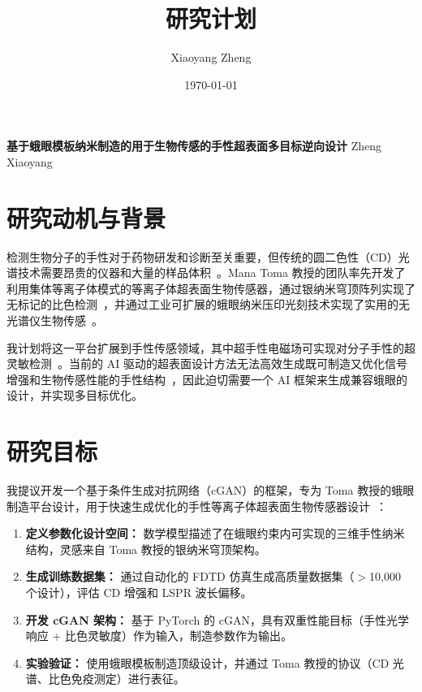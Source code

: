 \documentclass[11pt,a4paper]{article}
\title{研究计划}
\author{Xiaoyang Zheng}
\date{\today}
\begin{document}
\begin{center}
    \Large \textbf{基于蛾眼模板纳米制造的用于生物传感的手性超表面多目标逆向设计}
    \vspace{4pt}
    \normalsize Zheng Xiaoyang
\end{center}
\vspace{4pt}

\section*{研究动机与背景}
检测生物分子的手性对于药物研发和诊断至关重要，但传统的圆二色性（CD）光谱技术需要昂贵的仪器和大量的样品体积~\cite{nanophotonic_biosensors_acs}。Mana Toma 教授的团队率先开发了利用集体等离子体模式的等离子体超表面生物传感器，通过银纳米穹顶阵列实现了无标记的比色检测~\cite{toma_researches,toma_colorimetric_biosensor,toma_plasmonic_metasurface}，并通过工业可扩展的蛾眼纳米压印光刻技术实现了实用的无光谱仪生物传感~\cite{nil_metasurface_review}。

我计划将这一平台扩展到手性传感领域，其中超手性电磁场可实现对分子手性的超灵敏检测~\cite{chiral_biosensing_review}。当前的 AI 驱动的超表面设计方法无法高效生成既可制造又优化信号增强和生物传感性能的手性结构~\cite{dl_nanophotonics_rg}，因此迫切需要一个 AI 框架来生成兼容蛾眼的设计，并实现多目标优化。

\section*{研究目标}
我提议开发一个基于条件生成对抗网络（cGAN）的框架，专为 Toma 教授的蛾眼制造平台设计，用于快速生成优化的手性等离子体超表面生物传感器设计~\cite{conditional_gan_nanophotonics,gan_nanophotonic_inverse}：

\begin{enumerate}
    \setlength{\itemsep}{0.5pt}
    \setlength{\parskip}{0pt}
  \item \textbf{定义参数化设计空间：} 数学模型描述了在蛾眼约束内可实现的三维手性纳米结构，灵感来自 Toma 教授的银纳米穹顶架构。
  \item \textbf{生成训练数据集：} 通过自动化的 FDTD 仿真生成高质量数据集（$>$10,000 个设计），评估 CD 增强和 LSPR 波长偏移。
  \item \textbf{开发 cGAN 架构：} 基于 PyTorch 的 cGAN，具有双重性能目标（手性光学响应 + 比色灵敏度）作为输入，制造参数作为输出。
  \item \textbf{实验验证：} 使用蛾眼模板制造顶级设计，并通过 Toma 教授的协议（CD 光谱、比色免疫测定）进行表征。
\end{enumerate}
\end{document}
